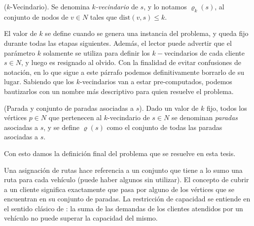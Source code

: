 \begin{definition}
    ($k$-Vecindario).
    Se denomina \emph{$k$-vecindario} de $s$, y lo notamos $\varrho_k(s)$, al conjunto de nodos de $v \in N$ tales que $\text{dist}(v, s) \leq k$.
\end{definition}

El valor de $k$ se define cuando se genera una instancia del problema, y queda fijo durante todas las etapas siguientes. Además, el lector puede advertir que el parámetro $k$ solamente se utiliza para definir los $k-$vecindarios de cada cliente $s \in N$, y luego es resignado al olvido. Con la finalidad de evitar confusiones de notación, en lo que sigue a este párrafo podemos definitivamente borrarlo de su lugar. Sabiendo que los $k$-vecindarios van a estar pre-computados, podemos bautizarlos con un nombre más descriptivo para quien resuelve el problema. 

\begin{definition}
    (Parada y conjunto de paradas asociadas a $s$).
    Dado un valor de $k$ fijo, todos los vértices $p \in N$ que pertenecen al $k$-vecindario de $s \in N$ se denominan \emph{paradas} asociadas a $s$, y se define $\varrho(s)$ como el conjunto de todas las paradas asociadas a $s$. 
\end{definition}

Con esto damos la definición final del problema que se resuelve en esta tesis.

\label{star-vrp}

Una asignación de rutas hace referencia a un conjunto que tiene a lo sumo una ruta para cada vehículo (puede haber algunos sin utilizar). El concepto de cubrir a un cliente significa exactamente que pasa por alguno de los vértices que se encuentran en su conjunto de paradas. La restricción de capacidad se entiende en el sentido clásico de : la suma de las demandas de los clientes atendidos por un vehículo no puede superar la capacidad del mismo. 

